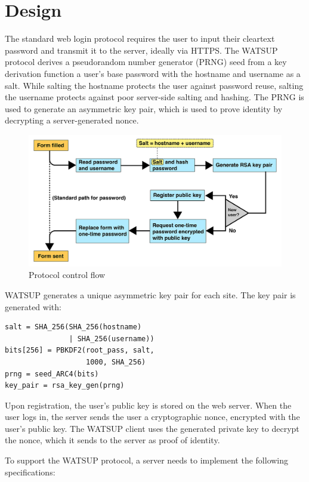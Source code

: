 \section{Design}
\label{sec:design}

The standard web login protocol requires the user to input their cleartext password and transmit it to the server, ideally via HTTPS. The WATSUP protocol derives a pseudorandom number generator (PRNG) seed from a key derivation function a user's base password with the hostname and username as a salt. While salting the hostname protects the user against password reuse, salting the username protects against poor server-side salting and hashing. The PRNG is used to generate an asymmetric key pair, which is used to prove identity by decrypting a server-generated nonce.

\begin{figure}
    \centerline{\includegraphics{protocol.png}}
    \caption{Protocol control flow}
\end{figure}

WATSUP generates a unique asymmetric key pair for each site. The key pair is generated with:

\begin{verbatim}
salt = SHA_256(SHA_256(hostname)
               | SHA_256(username))
bits[256] = PBKDF2(root_pass, salt,
                   1000, SHA_256)
prng = seed_ARC4(bits)
key_pair = rsa_key_gen(prng)
\end{verbatim}

Upon registration, the user's public key is stored on the web server. When the user logs in, the server sends the user a cryptographic nonce, encrypted with the user's public key. The WATSUP client uses the generated private key to decrypt the nonce, which it sends to the server as proof of identity.

To support the WATSUP protocol, a server needs to implement the following specifications:

